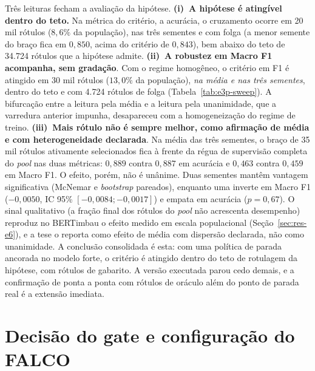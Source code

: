 Três leituras fecham a avaliação da hipótese. \textbf{(i)~A hipótese é atingível dentro
do teto.} Na métrica do critério, a acurácia, o cruzamento ocorre em 20 mil
rótulos ($8{,}6\%$ da população), nas três sementes e com folga (a menor
semente do braço fica em $0{,}850$, acima do critério de $0{,}843$), bem
abaixo do teto de 34.724 rótulos que a hipótese admite.
\textbf{(ii)~A robustez em Macro F1 acompanha, sem gradação}. Com o regime
homogêneo, o critério em F1 é atingido em 30 mil rótulos ($13{,}0\%$ da
população), \emph{na média e nas três sementes}, dentro do teto e com 4.724
rótulos de folga (Tabela~\ref{tab:e3p-sweep}). A bifurcação entre a leitura pela
média e a leitura pela unanimidade, que a varredura anterior impunha,
desapareceu com a homogeneização do regime de treino.
\textbf{(iii)~Mais rótulo não é sempre melhor, como afirmação de média e com
heterogeneidade declarada}. Na média das três sementes, o braço de 35 mil rótulos ativamente
selecionados fica à frente da régua de supervisão completa do \textit{pool} nas
duas métricas: $0{,}889$ contra $0{,}887$ em acurácia e $0{,}463$ contra
$0{,}459$ em Macro F1. O efeito, porém, não é unânime. Duas sementes mantêm
vantagem significativa (McNemar e \textit{bootstrap} pareados), enquanto uma
inverte em Macro F1 ($-0{,}0050$, IC 95\% $[-0{,}0084;-0{,}0017]$) e empata em
acurácia ($p=0{,}67$). O sinal
qualitativo (a fração final dos rótulos do \textit{pool} não acrescenta
desempenho) reproduz no BERTimbau o efeito medido em escala populacional
(Seção~\ref{sec:res-e6}), e a tese o reporta como efeito de média com
dispersão declarada, não como unanimidade. A conclusão consolidada é esta: com uma política de parada ancorada no modelo
forte, o critério é atingido dentro do teto de rotulagem da hipótese, com
rótulos de gabarito. A versão executada parou cedo demais, e a confirmação de
ponta a ponta com rótulos de oráculo além do ponto de parada real é a extensão
imediata.

\section{Decisão do gate e configuração do FALCO}
\label{sec:res-gate}


